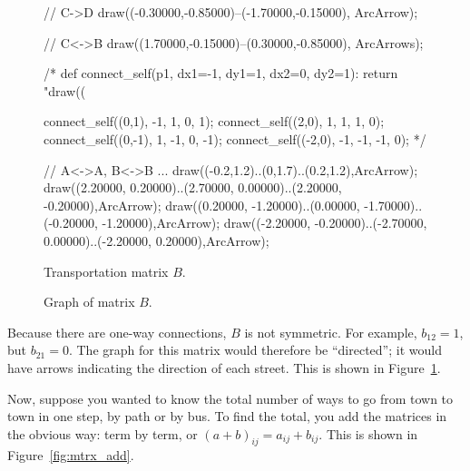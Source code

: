 \documentclass[../gatm.tex]{subfiles}
\begin{document}
\begin{figure}[h]
\begin{center}
\begin{minipage}[b]{0.45\textwidth}
\begin{asy}[width=0.7\textwidth]
				// C->D
				draw((-0.30000,-0.85000)--(-1.70000,-0.15000), ArcArrow);
				
				// C<->B
				draw((1.70000,-0.15000)--(0.30000,-0.85000), ArcArrows);
				
				/*
				def connect_self(p1, dx1=-1, dy1=1, dx2=0, dy2=1):
					return "draw((%
				
				connect_self((0,1), -1, 1, 0, 1);
				connect_self((2,0), 1, 1, 1, 0);
				connect_self((0,-1), 1, -1, 0, -1);
				connect_self((-2,0), -1, -1, -1, 0);
				*/
				
				// A<->A, B<->B ...
				draw((-0.2,1.2)..(0,1.7)..(0.2,1.2),ArcArrow);
				draw((2.20000, 0.20000)..(2.70000, 0.00000)..(2.20000, -0.20000),ArcArrow);
				draw((0.20000, -1.20000)..(0.00000, -1.70000)..(-0.20000, -1.20000),ArcArrow);
				draw((-2.20000, -0.20000)..(-2.70000, 0.00000)..(-2.20000, 0.20000),ArcArrow);
			\end{asy}
		\end{minipage}
	\end{center}
	\vspace*{-2\baselineskip}
	\begin{center}
		\begin{minipage}[t]{0.45\textwidth}
			\caption{Transportation matrix $B$.}
			\label{fig:adjacency_b}
		\end{minipage}
		\hfill
		\begin{minipage}[t]{0.45\textwidth}
			\caption{Graph of matrix $B$.}
			\label{fig:directed}
		\end{minipage}
	\end{center}
\end{figure}

\noindent Because there are one-way connections, $B$ is not symmetric. For example, $b_{12}=1$, but $b_{21}=0$. The graph for this matrix would therefore be ``directed''; it would have arrows indicating the direction of each street. This is shown in Figure~\ref{fig:directed}.

Now, suppose you wanted to know the total number of ways to go from town to town in one step, by path or by bus. To find the total, you add the matrices in the obvious way: term by term, or $(a+b)_{ij}=a_{ij}+b_{ij}$. This is shown in Figure~\ref{fig:mtrx_add}.
\end{document}
